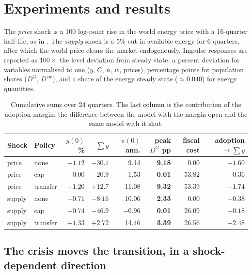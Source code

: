 \documentclass[11pt,a4paper]{article}
\begin{document}
\section{Experiments and results}

The \emph{price} shock is a 100 log-point rise in the world energy price with
a 16-quarter half-life, as in \citet{ARS2024}. The \emph{supply} shock is a 5\%
cut in available energy for 6 quarters, after which the world price clears
the market endogenously. Impulse responses are reported as $100\times$ the
level deviation from steady state: a percent deviation for variables
normalised to one ($y$, $C$, $n$, $w$, prices), percentage points for
population shares ($D^{G}$, $D^{sw}$), and a share of the energy steady state
($\approx0.040$) for energy quantities.

\begin{table}[h]\centering
\small
\begin{tabular}{llrrrrrr}
\toprule
Shock & Policy & $y(0)$\% & $\sum y$ & $\pi(0)$ ann. & peak $D^{G}$ pp & fiscal cost & adoption $\to \sum y$\\
\midrule
price  & none     & $-1.12$ & $-30.1$ & 9.14  & \textbf{9.18} & 0.00 & $-1.60$\\
price  & cap      & $-0.00$ & $-20.9$ & $-1.53$ & \textbf{0.01} & 53.82 & $+0.36$\\
price  & transfer & $+1.20$ & $+12.7$ & 11.08 & \textbf{9.32} & 53.39 & $-1.74$\\
\midrule
supply & none     & $-0.71$ & $-8.16$ & 10.06  & \textbf{2.33} & 0.00 & $+0.38$\\
supply & cap      & $-0.74$ & $-46.9$ & $-0.96$ & \textbf{0.01} & 26.09 & $+0.18$\\
supply & transfer & $+1.33$ & $+2.72$ & 14.46 & \textbf{3.39} & 26.56 & $+2.48$\\
\bottomrule
\end{tabular}
\caption{Cumulative sums over 24 quarters. The last column is the contribution
of the adoption margin: the difference between the model with the margin open
and the same model with it shut.}
\label{tab:summary}
\end{table}

\subsection{The crisis moves the transition, in a shock-dependent direction}
\end{document}
